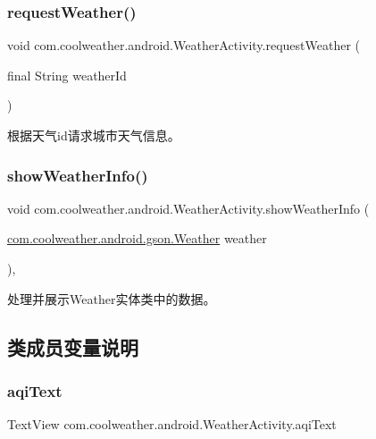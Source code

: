 \subsubsection{\texorpdfstring{requestWeather()}{requestWeather()}}
{\footnotesize\ttfamily void com.\+coolweather.\+android.\+Weather\+Activity.\+request\+Weather (\begin{DoxyParamCaption}\item[{final String}]{weather\+Id }\end{DoxyParamCaption})\hspace{0.3cm}{\ttfamily [inline]}}

根据天气id请求城市天气信息。 \mbox{\label{classcom_1_1coolweather_1_1android_1_1_weather_activity_abb54e265b2c45384b36a44b4e6ef4ab7}} 
\subsubsection{\texorpdfstring{showWeatherInfo()}{showWeatherInfo()}}
{\footnotesize\ttfamily void com.\+coolweather.\+android.\+Weather\+Activity.\+show\+Weather\+Info (\begin{DoxyParamCaption}\item[{\mbox{\hyperlink{classcom_1_1coolweather_1_1android_1_1gson_1_1_weather}{com.\+coolweather.\+android.\+gson.\+Weather}}}]{weather }\end{DoxyParamCaption})\hspace{0.3cm}{\ttfamily [inline]}, {\ttfamily [private]}}

处理并展示\+Weather实体类中的数据。 

\subsection{类成员变量说明}
\mbox{\label{classcom_1_1coolweather_1_1android_1_1_weather_activity_aff3e4aaa9258a0fc73d3918ed5d5ab19}} 
\subsubsection{\texorpdfstring{aqiText}{aqiText}}
{\footnotesize\ttfamily Text\+View com.\+coolweather.\+android.\+Weather\+Activity.\+aqi\+Text\hspace{0.3cm}{\ttfamily [private]}}

